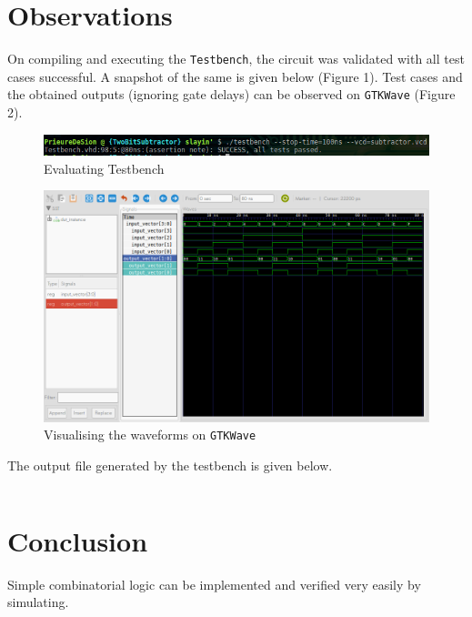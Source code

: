 \documentclass[a4paper, 11pt]{article}
\begin{document}
\section{Observations}

On compiling and executing the \texttt{Testbench}, the circuit was validated with all test cases successful. A snapshot of the same is given below (Figure 1). Test cases and the obtained outputs (ignoring gate delays) can be observed on \texttt{GTKWave} (Figure 2).

\begin{figure}[p]
\centering
\includegraphics[scale=0.7]{Subtractor_Passed}
\caption{Evaluating Testbench}
\end{figure}

\begin{figure}[p]
\centering
\includegraphics[scale=0.45]{Subtractor_Wave}
\caption{Visualising the waveforms on \texttt{GTKWave}}
\end{figure}

The output file generated by the testbench is given below.
\inputminted{text}{Submission/TwoBitSubtractor/OUTPUTS.txt}

\section*{Conclusion}
Simple combinatorial logic can be implemented and verified very easily by simulating.
\end{document}
